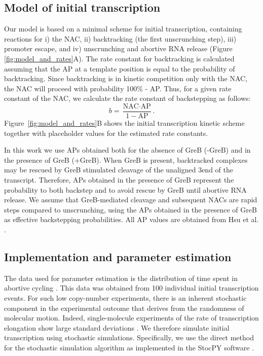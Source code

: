 %
\subsection{Model of initial transcription}
Our model is based on a minimal scheme for initial transcription, containing
reactions for i) the NAC, ii) backtracking (the
first unscrunching step), iii) promoter escape, and iv) unscrunching and
abortive RNA release (Figure \ref{fig:model_and_rates}A). The rate constant
for backtracking is calculated assuming that the AP at a template position is
equal to the probability of backtracking. Since backtracking is in kinetic
competition only with the NAC, the NAC will proceed with probability 100\% -
AP. Thus, for a given rate constant of the NAC, we calculate the rate
constant of backstepping as follows:
\begin{equation}
  b = \frac{\text{NAC}\cdot\text{AP}}{1-\text{AP}}.
  \label{eq:backtrackingcalc}
\end{equation}
Figure~\ref{fig:model_and_rates}B shows the initial transcription kinetic
scheme together with placeholder values for the estimated rate constants.

In this work we use APs obtained both for the absence of GreB (-GreB) and in
the presence of GreB (+GreB). When GreB is present, backtracked complexes may
be rescued by GreB stimulated cleavage of the unaligned 3\ppp end of the
transcript. Therefore, APs obtained in the presence of GreB represent the
probability to both backstep and to avoid rescue by GreB until abortive RNA
release. We assume that GreB-mediated cleavage and subsequent NACs are rapid
steps compared to unscrunching, using the APs obtained in the presence of GreB
as effective backstepping probabilities. All AP values are obtained from Hsu
et al. \cite{hsu_initial_2006}.

\subsection{Implementation and parameter estimation}
The data used for parameter estimation is the distribution of time spent in
abortive cycling \cite{revyakin_abortive_2006}. This data was obtained from
100 individual initial transcription events. For such low copy-number
experiments, there is an inherent stochastic component in the experimental
outcome that derives from the randomness of molecular motion. Indeed,
single-molecule experiments of the rate of transcription elongation show large
standard deviations \cite{adelman_single_2002,
tolic-norrelykke_diversity_2004}. We therefore simulate initial transcription
using stochastic simulations. Specifically, we use the direct method for the
stochastic simulation algorithm \cite{gillespie_exact_1977} as implemented in
the StocPY software \cite{maarleveld_stochpy:_2013}. 

